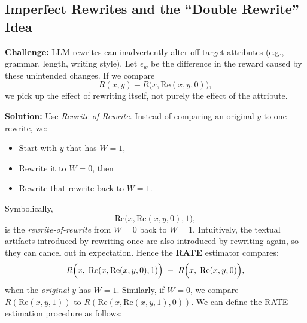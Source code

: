 \subsection{Imperfect Rewrites and the ``Double Rewrite'' Idea}

\textbf{Challenge:} LLM rewrites can inadvertently alter off-target attributes (e.g., grammar, length, writing style). Let $\epsilon_w$ be the difference in the reward caused by these unintended changes. If we compare
\[
R(x, y) - R\bigl(x, \text{Re}(x,y,0)\bigr),
\]
we pick up the effect of rewriting itself, not purely the effect of the attribute.

\textbf{Solution:} Use \emph{Rewrite-of-Rewrite}. Instead of comparing an original $y$ to one rewrite, we:
\begin{itemize}
    \item Start with $y$ that has $W=1$,
    \item Rewrite it to $W=0$, then
    \item Rewrite that rewrite back to $W=1$.
\end{itemize}
Symbolically,
\[
\text{Re}\bigl(x,\text{Re}(x,y,0),1\bigr),
\]
is the \emph{rewrite-of-rewrite} from $W=0$ back to $W=1$. Intuitively, the textual artifacts introduced by rewriting once are also introduced by rewriting again, so they can cancel out in expectation. Hence the \textbf{RATE} estimator compares:
\[
R\Bigl(x,\;\text{Re}(x, \text{Re}(x,y,0),1)\Bigr) \;-\;
R\Bigl(x,\;\text{Re}(x,y,0)\Bigr),
\]
when the \emph{original} $y$ has $W=1$. Similarly, if $W=0$, we compare $R(\text{Re}(x,y,1))$ to $R(\text{Re}(x, \text{Re}(x,y,1),0))$. We can define the RATE estimation procedure as follows:
